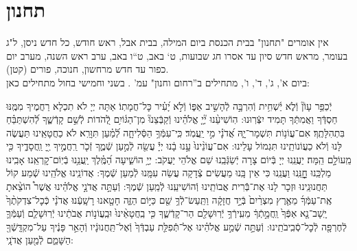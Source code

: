 \documentclass[twoside, openany, parskip=half, 11pt]{book}
\begin{document}
\nextpage


\section[תחנון]{ תחנון }
\label{tachanun mon thurs}
\begin{scriptsize}

\textsf{
אין אומרים "תחנון" בבית הכנסת ביום המילה, בבית אבל, ראש חודש, כל חדש ניסן, ל"ג בעומר, מראש חדש סיון עד אסרו חג שבועות, ט` באב, ט``ו באב, ערב ראש השנה, מערב יום כפור עד חדש מרחשון, חנוכה, פורים (קטן).\\
ביום א', ג', ד', ו', מתחילים ב''רחום וחנון" עמ'
\pageref{nefilas_apayim}.
בשני וחמישי בחול מתחילים כאן:
}

\end{scriptsize}

יְֿכַפֵּ֥ר עָוֹן֘ וְֿלֹ֢א יַ֫שְׁחִ֥ית וְֿהִרְבָּ֣ה לְֿהָשִׁ֣יב אַפּ֑וֹ וְֿלֹ֣א יָ֝עִ֗יר כׇּל־חֲמָתֽוֹ׃ אַתָּה יְיָ לֹא תִכְלָא רַחֲמֶיךָ מִמֶּֽנּוּ חַסְדְּֿךָ וַאֲמִתְּֿךָ תָּמִיד יִצְּֿרֽוּנוּ: הֽוֹשִׁיעֵ֨נוּ יְ֘יָ֤ אֱלֹהֵ֗ינוּ וְֿקַבְּֿצֵנוּ֘ מִן־הַגּ֫וֹיִ֥ם לְֿ֭הֹדוֹת לְֿשֵׁ֣ם קָדְֿשֶׁ֑ךָ לְֿ֝הִשְׁתַּבֵּ֗חַ בִּתְהִלָּתֶֽךָ׃
אִם־עֲוֹנ֥וֹת תִּשְׁמָר־יָ֑הּ אֲ֝דֹנָ֗י מִ֣י יַֽעֲמֹֽד׃ כִּֽי־עִמְּֿךָ֥ הַסְּֿלִיחָ֑ה לְֿ֝מַ֗עַן תִּוָּרֵֽא׃ לֹא כַחֲטָאֵֽינוּ תַּעֲשֶׂה לָּנוּ וְֿלֹא כַעֲוֹנוֹתֵֽינוּ תִּגְמוֹל עָלֵינוּ:
אִם־עֲוֹנֵ֨ינוּ֙ עָ֣נוּ בָ֔נוּ יְיָ֕ עֲשֵׂ֖ה לְֿמַ֣עַן שְֿׁמֶ֑ךָ זְֿכֹ֤ר רַֽחֲמֶ֣יךָ יְ֖יָ וַֽחֲסָדֶ֑יךָ כִּ֖י מֵֽעוֹלָ֣ם הֵֽמָּה׃ יַעֲנֵֽנוּ יְיָ בְּֿיוֹם צָרָה יְֿשַׂגְּֿבֵֽנוּ שֵׁם אֱלֹהֵי יַעֲקֹב:
יְיָ֥ הוֹשִׁ֑יעָה הַ֝מֶּֽ֗לֶךְ יַֽעֲנֵ֥נוּ בְֿיֽוֹם־קׇרְאֵֽנוּ׃
אָבִֽינוּ מַלְכֵּֽנוּ חׇׇׇׇׇׇׇׇָנֵּֽנוּ וַעֲנֵֽנוּ כִּי אֵין בָּֽנוּ מַעֲשִׂים צְֿדָקָה עֲשֵׂה עִמָּֽנוּ לְֿמַעַן שְֿׁמֶךָ:
אֲדוֹנֵֽינוּ אֱלֹהֵֽינוּ שְֿׁמַע קוֹל תַּחֲנוּנֵֽינוּ וּזְכָר לָנוּ אֶת־בְּֿֿרִית אֲבוֹתֵֽינוּ וְֿהוֹשִׁיעֵֽנוּ לְֿמַֽעַן שְֿׁמֶךָ:
וְֿעַתָּ֣ה אֲדֹנָ֣י אֱלֹהֵ֗ינוּ אֲשֶׁר֩ הוֹצֵ֨אתָ אֶֽת־עַמְּֿךָ֜ מֵאֶ֤רֶץ מִצְרַ֨יִם֙ בְּֿיָ֣ד חֲזָקָ֔ה וַתַּֽעַשׂ־לְֿךָ֥ שֵׁ֖ם כַּיּ֣וֹם הַזֶּ֑ה חָטָ֖אנוּ רָשָֽׁעְֿנוּ׃
אֲדֹנָ֗י כְּֿכׇל־צִדְקֹתֶ֨ךָ֙ יָֽשָׁב־נָ֤א אַפְּֿךָ֙ וַֽחֲמָ֣תְֿךָ֔ מֵעִֽירְֿךָ֥ יְֿרֽוּשָׁלַ֖ם הַר־קָדְֿשֶׁ֑ךָ כִּ֤י בַֽחֲטָאֵ֨ינוּ֙ וּבַֽעֲוֹנ֣וֹת אֲבֹתֵ֔ינוּ יְֿרֽוּשָׁלַ֧ם וְֿעַמְּֿךָ֛ לְֿחֶרְפָּ֖ה לְֿכׇל־סְֿבִֽיבֹתֵֽינוּ:
וְֿעַתָּ֣ה שְֿׁמַ֣ע אֱלֹהֵ֗ינוּ אֶל־תְּֿֿפִלַּ֤ת עַבְדְּֿךָ֙ וְֿאֶל־תַּֽחֲנוּנָ֔יו וְֿהָאֵ֣ר פָּנֶ֔יךָ עַל־מִקְדָּֽשְֿׁךָ֖ הַשָּׁמֵ֑ם לְֿמַ֖עַן אֲדֹנָֽי:
\end{document}
